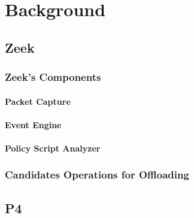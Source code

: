 \chapter{Background}
\label{cap:background}



\section{Zeek}

\subsection{Zeek's Components}

\subsubsection{Packet Capture}

\subsubsection{Event Engine}

\subsubsection{Policy Script Analyzer}

\subsection{Candidates Operations for Offloading}
\label{sec:candidate_operations}

\section{P4}
